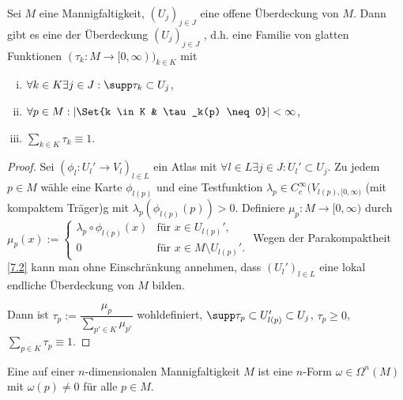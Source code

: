 \begin{st} \label{7.3}
    Sei $M$ eine Mannigfaltigkeit, $(U_j)_{j\in J}$ eine offene Überdeckung von $M$.
    Dann gibt es eine der Überdeckung $(U_j)_{j \in J}$ , d.h. eine Familie von glatten Funktionen $(\tau_k: M \to [0, \infty))_{k \in K}$ mit
    \begin{enumerate}[(i)]
        \item
            $\forall k \in K \exists j \in J: \supp \tau_k \subset U_j$,        
        \item
            $\forall p \in M: |\Set{k \in K & \tau_k(p) \neq 0}| < \infty$,
        \item
            $\sum_{k \in K} \tau_k \equiv 1$.
    \end{enumerate}
    \begin{proof}
        Sei $(\phi_l: U_l' \to V_l)_{l \in L}$ ein Atlas mit $\forall l \in L \exists j \in J: U_l' \subset U_j$.
        Zu jedem $p \in M$ wähle eine Karte $\phi_{l(p)}$ und eine Testfunktion $\lambda_p \in C_c^\infty(V_{l(p), [0,\infty)}$ (mit kompaktem Träger)g mit $\lambda_p(\phi_{l(p)}(p)) > 0$.
        Definiere $\mu_p: M \to [0, \infty)$ durch
        \begin{math}
            \mu_p(x) := \begin{cases}
                \lambda_p \circ \phi_{l(p)}(x) & \text{für $x \in U_{l(p)}'$}, \\
                0 & \text{für $x \in M \setminus U_{l(p)}'$}.
            \end{cases}
        \end{math}
        Wegen der Parakompaktheit \ref{7.2} kann man ohne Einschränkung annehmen, dass $(U_l')_{l \in L}$ eine lokal endliche Überdeckung von $M$ bilden.

        Dann ist
        \begin{math}
            \tau_p := \dfrac{\mu_p}{\sum_{p' \in K} \mu_{p'}}
        \end{math}
        wohldefiniert, $\supp \tau_p \subset U_{l(p)}' \subset U_j$,
        $\tau_p \ge 0$, $\sum_{p \in K} \tau_p \equiv 1$.
    \end{proof}
\end{st}

\begin{df} \label{7.4}
    Eine  auf einer $n$-dimensionalen Mannigfaltigkeit $M$ ist eine $n$-Form $\omega \in \Omega^n(M)$ mit $\omega(p) \neq 0$ für alle $p \in M$.
\end{df}

